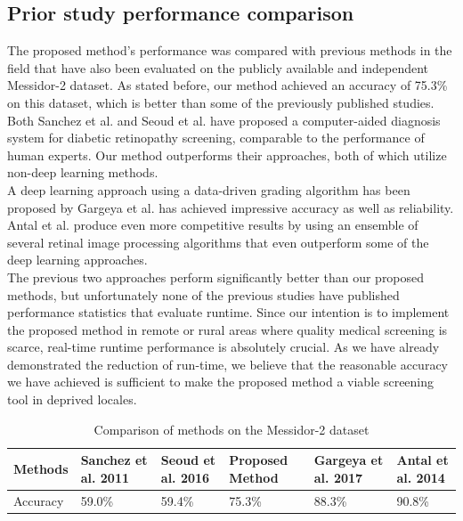 \documentclass[12pt]{report}
\begin{document}
\subsection{Prior study performance comparison}
The proposed method's performance was compared with previous methods in the field that have also been evaluated on the publicly available and independent Messidor-2 dataset. As stated before, our method achieved an accuracy of 75.3\% on this dataset, which is better than some of the previously published studies.\\
\noindent Both Sanchez et al. \cite{sanchez2011evaluation} and Seoud et al. \cite{seoud2016red} have proposed a computer-aided diagnosis system for diabetic retinopathy screening, comparable to the performance of human experts. Our method outperforms their approaches, both of which utilize non-deep learning methods.\\
A deep learning approach using a data-driven grading algorithm has been proposed by Gargeya et al. \cite{gargeya2017automated} has achieved impressive accuracy as well as reliability. Antal et al. \cite{antal2014ensemble} produce even more competitive results by using an ensemble of several retinal image processing algorithms that even outperform some of the deep learning approaches.\\
The previous two approaches perform significantly better than our proposed methods, but unfortunately none of the previous studies have published performance statistics that evaluate runtime. Since our intention is to implement the proposed method in remote or rural areas where quality medical screening is scarce, real-time runtime performance is absolutely crucial. As we have already demonstrated the reduction of run-time, we believe that the reasonable accuracy we have achieved is sufficient to make the proposed method a viable screening tool in deprived locales.

\begin{table}[H]
	\begin{center}
		\begin{tabular}{ |p{1.6cm}|p{2.35cm}|p{2.35cm}|p{2.35cm}|p{2.35cm}|p{2.35cm}| }
			\hline
			Methods & Sanchez et al. 2011 \cite{sanchez2011evaluation} & Seoud et al. 2016 \cite{seoud2016red} & Proposed Method & Gargeya et al. 2017 \cite{gargeya2017automated} & Antal et al. 2014 \cite{antal2014ensemble}\\ 
			\hline
			Accuracy &   59.0\%&  59.4\% &   75.3\% &  88.3\% & 90.8\%\\   
			\hline
		\end{tabular}
		\caption{Comparison of methods on the Messidor-2 dataset}
	\end{center}
\end{table}
\end{document}

